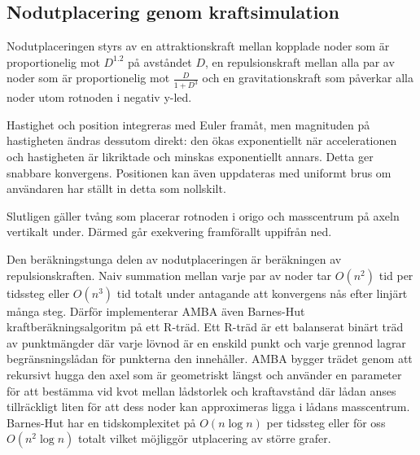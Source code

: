 \subsection{Nodutplacering genom kraftsimulation}

Nodutplaceringen styrs av en attraktionskraft mellan kopplade noder som är
proportionelig mot $D^{1.2}$ på avståndet $D$, en repulsionskraft mellan alla
par av noder som är proportionelig mot $\frac{D}{1+D^3}$ och en
gravitationskraft som påverkar alla noder utom rotnoden i negativ y-led.

Hastighet och position integreras med Euler framåt, men magnituden på
hastigheten ändras dessutom direkt: den ökas exponentiellt när accelerationen
och hastigheten är likriktade och minskas exponentiellt annars. Detta ger
snabbare konvergens. Positionen kan även uppdateras med uniformt brus om
användaren har ställt in detta som nollskilt.

Slutligen gäller tvång som placerar rotnoden i origo och masscentrum på axeln
vertikalt under. Därmed går exekvering framförallt uppifrån ned.

Den beräkningstunga delen av nodutplaceringen är beräkningen av
repulsionskraften. Naiv summation mellan varje par av noder tar $O(n^2)$ tid per
tidssteg eller $O(n^3)$ tid totalt under antagande att konvergens nås efter
linjärt många steg. Därför implementerar AMBA även Barnes-Hut
kraftberäkningsalgoritm på ett R-träd. Ett R-träd är ett balanserat binärt träd
av punktmängder där varje lövnod är en enskild punkt och varje grennod lagrar
begränsningslådan för punkterna den innehåller. AMBA bygger trädet genom att
rekursivt hugga den axel som är geometriskt längst och använder en parameter för
att bestämma vid kvot mellan lådstorlek och kraftavstånd där lådan anses
tillräckligt liten för att dess noder kan approximeras ligga i lådans
masscentrum. Barnes-Hut har en tidskomplexitet på $O(n\log n)$ per tidssteg
eller för oss $O(n^2\log n)$ totalt vilket möjliggör utplacering av större
grafer.
